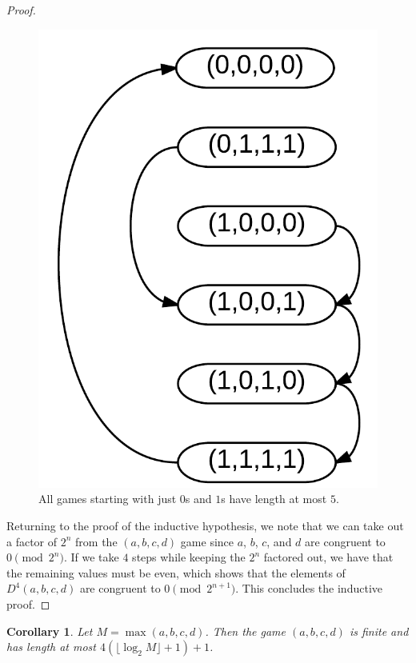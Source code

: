 \documentclass[12pt]{amsart}
\newtheorem{corollary}[theorem]{Corollary}
\newcommand{\diff}{D}
\begin{document}
\begin{proof}
\begin{figure}
\includegraphics{number_squares_0s_and_1s.png}
\caption{All games starting with just $0$s and $1$s have length at most $5$.}
\label{fig:zerosones}
\end{figure}

Returning to the proof of the inductive hypothesis, we note that we can take out a factor of $2^n$ from the $(a,b,c,d)$ game since $a$, $b$, $c$, and $d$ are congruent to $0\pmod{2^n}$. If we take $4$ steps while keeping the $2^n$ factored out, we have that the remaining values must be even, which shows that the elements of $\diff^4(a,b,c,d)$ are congruent to $0\pmod{2^{n+1}}$. This concludes the inductive proof.

\end{proof}

\begin{corollary}
Let $M=\max(a,b,c,d)$. Then the game $(a,b,c,d)$ is finite and has length at most $4(\lfloor\log_2{M}\rfloor + 1) + 1$.
\end{corollary}
\end{document}

